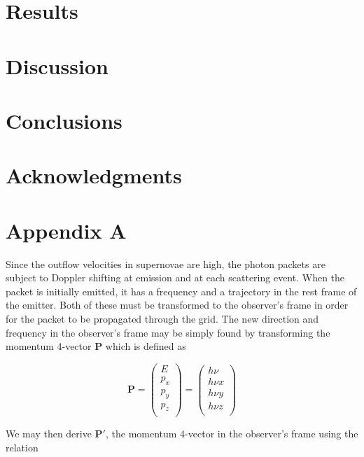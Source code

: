 \documentclass[useAMS,usenatbib]{mn2e}
\begin{document}
\section{Results}

\section{Discussion}

\section{Conclusions}


\section*{Acknowledgments}





\appendix

\section[]{Appendix A}
Since the outflow velocities in supernovae are high, the photon packets are subject to Doppler shifting at emission and at each scattering event.  When the packet is initially emitted, it has a frequency and a trajectory in the rest frame of the emitter. Both of these must be transformed to the observer's frame in order for the packet to be propagated through the grid.  The new direction and frequency in the observer's frame may be simply found by transforming the momentum 4-vector $\mathbf{P}$ which is defined as

\begin{equation}
\mathbf{P}=
\begin{pmatrix}
	E \\
	p_x \\
	p_y \\
	p_z \\
	\end{pmatrix} =
	\begin{pmatrix}
	h \nu \\
	h \nu x \\
	h \nu y \\
	h \nu z \\
	\end{pmatrix}
\end{equation}


\noindent We may then derive $\mathbf{P'}$, the momentum 4-vector in the observer's frame using the relation
\end{document}
